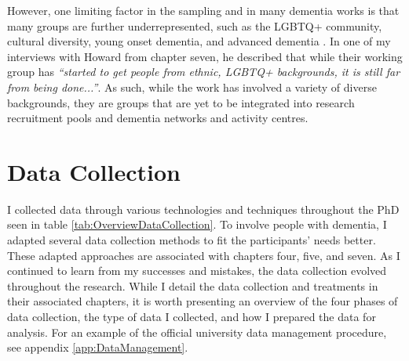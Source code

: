However, one limiting factor in the sampling and in many dementia works is that many groups are further underrepresented, such as the LGBTQ+ community, cultural diversity, young onset dementia, and advanced dementia \citep{mcgovern2014forgotten}. In one of my interviews with Howard from chapter seven, he described that while their working group has \textit{``started to get people from ethnic, LGBTQ+ backgrounds, it is still far from being done...''}. As such, while the work has involved a variety of diverse backgrounds, they are groups that are yet to be integrated into research recruitment pools and dementia networks and activity centres. 

\section{Data Collection}
\label{Method:DataCollection}
I collected data through various technologies and techniques throughout the PhD seen in table \ref{tab:OverviewDataCollection}. To involve people with dementia, I adapted several data collection methods to fit the participants' needs better. These adapted approaches are associated with chapters four, five, and seven. As I continued to learn from my successes and mistakes, the data collection evolved throughout the research. While I detail the data collection and treatments in their associated chapters, it is worth presenting an overview of the four phases of data collection, the type of data I collected, and how I prepared the data for analysis. For an example of the official university data management procedure, see appendix \ref{app:DataManagement}.

